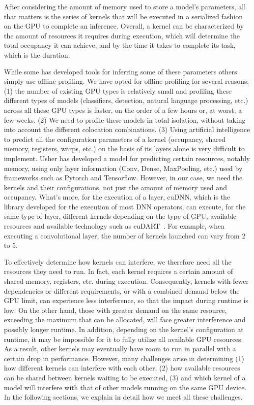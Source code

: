 After considering the amount of memory used to store a model's parameters, all that matters is the series of kernels that will be executed in a serialized fashion on the GPU to complete an inference. Overall, a kernel can be characterized by the amount of resources it requires during execution, which will determine the total occupancy it can achieve, and by the time it takes to complete its task, which is the duration.

While some has developed tools for inferring some of these parameters others simply use offline profiling. We have opted for offline profiling for several reasons: (1) the number of existing GPU types is relatively small and profiling these different types of models (classifiers, detection, natural language processing, etc.) across all these GPU types is faster, on the order of a few hours or, at worst, a few weeks. (2) We need to profile these models in total isolation, without taking into account the different colocation combinations. (3) Using artificial intelligence to predict all the configuration parameters of a kernel (occupancy, shared memory, registers, warps, etc.) on the basis of its layers alone is very difficult to implement. Usher has developed a model for predicting certain resources, notably memory, using only layer information (Conv, Dense, MaxPooling, etc.) used by frameworks such as Pytorch and Tensorflow. However, in our case, we need the kernels and their configurations, not just the amount of memory used and occupancy. What's more, for the execution of a layer, cuDNN, which is the library developed for the execution of most DNN operators, can execute, for the same type of layer, different kernels depending on the type of GPU, available resources and available technology such as cuDART~. For example, when executing a convolutional layer, the number of kernels launched can vary from 2 to 5.

To effectively determine how kernels can interfere, we therefore need all the resources they need to run. In fact, each kernel requires a certain amount of shared memory, registers, etc. during execution. Consequently, kernels with fewer dependencies or different requirements, or with a combined demand below the GPU limit, can experience less interference, so that the impact during runtime is low. On the other hand, those with greater demand on the same resource, exceeding the maximum that can be allocated, will face greater interference and possibly longer runtime. In addition, depending on the kernel's configuration at runtime, it may be impossible for it to fully utilize all available GPU resources. As a result, other kernels may eventually have room to run in parallel with a certain drop in performance. However, many challenges arise in determining (1) how different kernels can interfere with each other, (2) how available resources can be shared between kernels waiting to be executed, (3) and which kernel of a model will interfere with that of other models running on the same GPU device. In the following sections, we explain in detail how we meet all these challenges.